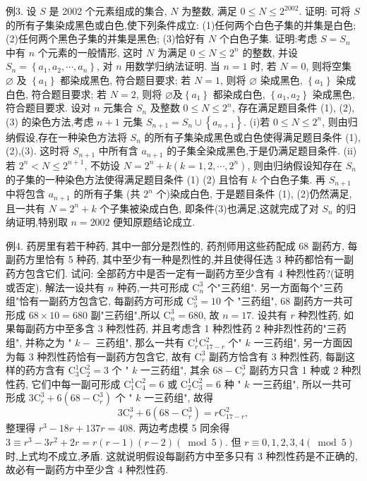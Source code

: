 例3. 设 $S$ 是 2002 个元素组成的集合, $N$ 为整数, 满足 $0 \leqslant N \leqslant 2^{2002}$. 证明: 可将 $S$ 的所有子集染成黑色或白色,使下列条件成立:
(1)任何两个白色子集的并集是白色;
(2)任何两个黑色子集的并集是黑色;
(3)恰好有 $N$ 个白色子集.
证明:考虑 $S=S_n$ 中有 $n$ 个元素的一般情形, 这时 $N$ 为满足 $0 \leqslant N \leqslant 2^n$ 的整数, 并设 $S_n=\left\{a_1, a_2, \cdots, a_n\right\}$, 对 $n$ 用数学归纳法证明.
当 $n=1$ 时, 若 $N=0$, 则将空集 $\varnothing$ 及 $\left\{a_1\right\}$ 都染成黑色, 符合题目要求; 若 $N=1$, 则将 $\varnothing$ 染成黑色, $\left\{a_1\right\}$ 染成白色, 符合题目要求; 若 $N=2$, 则将 $\varnothing 及 \left\{a_1\right\}$ 都染成白色, $\left\{a_1, a_2\right\}$ 染成黑色,符合题目要求.
设对 $n$ 元集合 $S_n$ 及整数 $0 \leqslant N \leqslant 2^n$, 存在满足题目条件 (1), (2), (3) 的染色方法,考虑 $n+1$ 元集 $S_{n+1}=S_n \cup\left\{a_{n+1}\right\}$.
(i)若 $0 \leqslant N \leqslant 2^n$, 则由归纳假设,存在一种染色方法将 $S_n$ 的所有子集染成黑色或白色使得满足题目条件 (1),(2),(3). 这时将 $S_{n+1}$ 中所有含 $a_{n+1}$ 的子集全染成黑色,于是仍满足题目条件.
(ii) 若 $2^n<N \leqslant 2^{n+1}$, 不妨设 $N=2^n+k\left(k=1,2, \cdots, 2^n\right)$, 则由归纳假设知存在 $S_n$ 的子集的一种染色方法使得满足题目条件 (1) (2) 且恰有 $k$ 个白色子集.
再 $S_{n+1}$ 中将包含 $a_{n+1}$ 的所有子集 (共 $2^n$ 个)染成白色, 于是题目条件 (1), (2)仍然满足, 且一共有 $N=2^n+k$ 个子集被染成白色, 即条件(3)也满足,这就完成了对 $S_n$ 的归纳证明,特别取 $n=2002$ 便知原题结论成立.



例4. 药房里有若干种药, 其中一部分是烈性的, 药剂师用这些药配成 68 副药方, 每副药方里恰有 5 种药, 其中至少有一种是烈性的,并且使得任选 3 种药都恰有一副药方包含它们.
试问: 全部药方中是否一定有一副药方至少含有 4 种烈性药?(证明或否定).
解法一设共有 $n$ 种药,一共可形成 $\mathrm{C}_n^3$ 个"三药组". 另一方面每个"三药组"恰有一副药方包含它, 每副药方可形成 $\mathrm{C}_5^3=10$ 个 "三药组", 68 副药方一共可形成 $68 \times 10=680$ 副"三药组",所以 $\mathrm{C}_n^3=680$, 故 $n=17$.
设共有 $r$ 种烈性药, 如果每副药方中至多含 3 种烈性药, 并且考虑含 1 种烈性药 2 种非烈性药的"三药组", 并称之为 " $k-$ 三药组", 那么一共有 $\mathrm{C}_r^1 \mathrm{C}_{17-r}^2$ 个" $k$ 一三药组", 另一方面因为每 3 种烈性药恰有一副药方包含它, 故有 $\mathrm{C}_r^3$ 副药方恰含有 3 种烈性药, 每副这样的药方含有 $\mathrm{C}_3^1 \mathrm{C}_2^2=3$ 个 " $k$ 一三药组", 其余
$68-\mathrm{C}_r^3$ 副药方只含 1 种或 2 种烈性药, 它们中每一副可形成 $\mathrm{C}_1^1 \mathrm{C}_4^2=6$ 或 $\mathrm{C}_2^1 \mathrm{C}_3^2=6$ 种 " $k$ 一三药组", 所以一共可形成 $3 \mathrm{C}_r^3+6\left(68-\mathrm{C}_r^3\right)$ 个 " $k$ 一三药组", 故得
$$
3 \mathrm{C}_r^3+6\left(68-\mathrm{C}_r^3\right)=r \mathrm{C}_{17-r}^2,
$$
整理得 $r^3-18 r+137 r=408$. 两边考虑模 5 同余得 $3 \equiv r^3-3 r^2+2 r= r(r-1)(r-2)(\bmod 5)$. 但 $r \equiv 0,1,2,3,4(\bmod 5)$ 时,上式均不成立,矛盾.
这就说明假设每副药方中至多只有 3 种烈性药是不正确的, 故必有一副药方中至少含 4 种烈性药.



